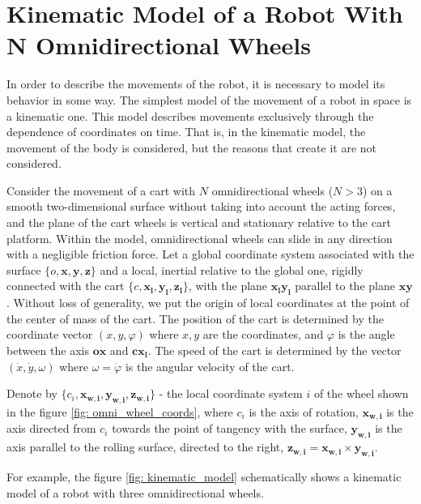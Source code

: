\documentclass[oneside,final,14pt]{extreport}
\newcommand{\bs}{\boldsymbol}
\begin{document}
\chapter{Kinematic Model of a Robot With N Omnidirectional Wheels}
In order to describe the movements of the robot, it is necessary to model its behavior in some way. The simplest model of the movement of a robot in space is a kinematic one. This model describes movements exclusively through the dependence of coordinates on time. That is, in the kinematic model, the movement of the body is considered, but the reasons that create it are not considered.

Consider the movement of a cart with $ N $ omnidirectional wheels ($ N> 3 $) on a smooth two-dimensional surface without taking into account the acting forces, and the plane of the cart wheels is vertical and stationary relative to the cart platform. Within the model, omnidirectional wheels can slide in any direction with a negligible friction force. Let a global coordinate system associated with the surface $ \{o, \boldsymbol{x}, \bs{y}, \bs{z} \} $ and a local, inertial relative to the global one, rigidly connected with the cart $ \{c, \bs{x_{l}}, \bs{y_{l}}, \bs{z_{l}} \} $, with the plane $ \bs{x_{l}} \bs{y_{l}} $ parallel to the plane $ \bs{x} \bs{y} $. Without loss of generality, we put the origin of local coordinates at the point of the center of mass of the cart. The position of the cart is determined by the coordinate vector $ (x, y, \varphi) $
where $ x, y $ are the coordinates, and $ \varphi $ is the angle between the axis $ \bs{ox} $ and $ \bs{cx_{l}} $. The speed of the cart is determined by the vector $ (\dot{x}, \dot{y}, \omega) $ where $ \omega = \dot{\varphi} $ is the angular velocity of the cart.

Denote by $ \{c_{i}, \bs{x_{w, i}}, \bs{y_{w, i}}, \bs{z_{w, i}} \} $ - the local coordinate system $ i $ of the wheel shown in the figure \ref{fig: omni_wheel_coords}, where $ c_{i} $ is the axis of rotation, $ \bs{x_{w, i}} $ is the axis directed from $ c_{i} $ towards the point of tangency with the surface, $ \bs{y_{w, i}} $ is the axis parallel to the rolling surface, directed to the right, $ \bs{z_{w, i}} = \bs{x_{w, i }} \times \bs{y_{w, i}} $.

For example, the figure \ref{fig: kinematic_model} schematically shows a kinematic model of a robot with three omnidirectional wheels.
\begin{figure} [H]
\end{figure}
\end{document}
